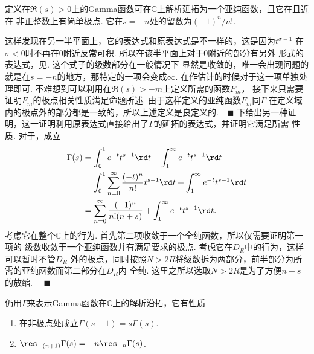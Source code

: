   \begin{thm}[Gamma函数的延拓]
    定义在$\Re(s)>0$上的Gamma函数可在$\mathbb{C}$上解析延拓为一个亚纯函数，且它在且近在
    非正整数上有简单极点. 它在$s=-n$处的留数为$(-1)^n/n!$.
  \end{thm}
  \remark
    这样发现在另一半平面上，它的表达式和原表达式是不一样的，这是因为$t^{\sigma-1}$
    在$\sigma<0$时不再在$0$附近反常可积. 所以在该半平面上对于$0$附近的部分有另外
    形式的表达式，见. 这个式子的级数部分在一般情况下
    显然是收敛的，唯一会出现问题的就是在$s=-n$的地方，那特定的一项会变成$\infty$.
    在作估计的时候对于这一项单独处理即可.
  \proof
    不难想到可以利用在$\Re(s)>-m$上定义所需的函数$F_m$，
    接下来只需要证明$F_m$的极点相关性质满足命题所述. 由于这样定义的亚纯函数$F_m$同$\Gamma$
    在定义域内的极点外的部分都是一致的，所以上述定义是良定义的.$\quad\blacksquare$
  \proof
    下给出另一种证明，这一证明利用原表达式直接给出了$\Gamma$的延拓的表达式，并证明它满足所需
    性质. 对于，成立
    \begin{equation}\begin{split}
      \label{equ: Gamma的延拓}
      \Gamma(s) &= \int_0^1e^{-t}t^{s-1}\rd t + \int_1^\infty e^{-t}t^{s-1}\rd t \\
      &= \int_0^1\sum_{n=0}^\infty\frac{(-t)^n}{n!}t^{s-1}\rd t 
        + \int_1^\infty e^{-t}t^{s-1}\rd t \\
      &= \sum_{n=0}^\infty\frac{(-1)^n}{n!(n+s)}
        + \int_1^\infty e^{-t}t^{s-1}\rd t.
    \end{split}\end{equation}
    考虑它在整个$\mathbb{C}$上的行为. 首先第二项收敛于一个全纯函数，所以仅需要证明第一项的
    级数收敛于一个亚纯函数并有满足要求的极点. 考虑它在$D_R$中的行为，这样可以暂时不管$D_R$
    外的极点，同时按照$N>2R$将级数拆为两部分，前半部分为所需的亚纯函数而第二部分在$D_R$内
    全纯. 这里之所以选取$N>2R$是为了方便$n+s$的放缩. $\quad\blacksquare$

  \begin{pos}[沿拓的准周期性]
    仍用$\Gamma$来表示Gamma函数在$\mathbb{C}$上的解析沿拓，它有性质
    \begin{enumerate}
      \item 在非极点处成立$\Gamma(s+1)=s\Gamma(s)$.
      \item $\res_{-(n+1)}\Gamma(s)=-n\res_{-n}\Gamma(s)$.
    \end{enumerate}
  \end{pos}

